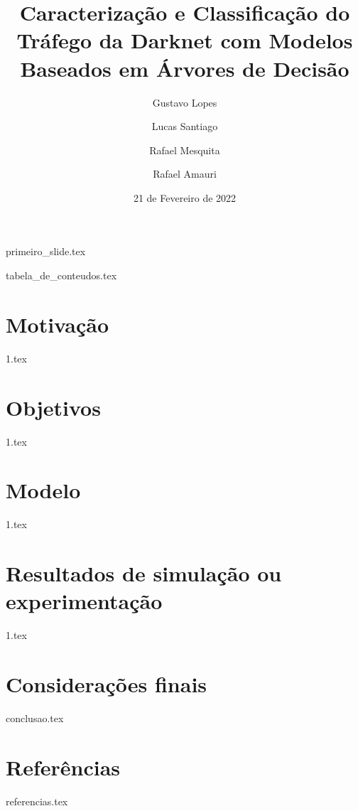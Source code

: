 \documentclass[aspectratio=169]{beamer}
\title{Caracterização e Classificação do Tráfego da Darknet com
 Modelos Baseados em Árvores de Decisão}
\author{Gustavo Lopes \and Lucas Santiago \and Rafael Mesquita \and Rafael Amauri }
\institute{Pontifícia Universidade Católica de Minas Gerais}
\date{21 de Fevereiro de 2022}
\begin{document}
    {primeiro_slide.tex}

    {tabela_de_conteudos.tex}


    \section{Motivação}

    {1.tex}

    \section{Objetivos}

    {1.tex}


    \section{Modelo}

    {1.tex}


    \section{Resultados de simulação ou experimentação}

    {1.tex}

    \section{Considerações finais}

    {conclusao.tex}
    
    \section{Referências}

    {referencias.tex}

\end{document}

